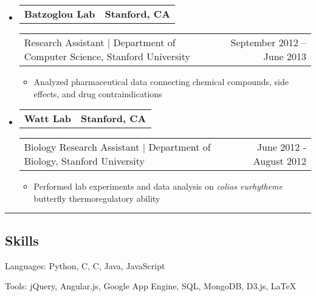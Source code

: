 \documentclass[10pt,letterpaper]{article}
\makeatletter
\newcommand{\topheaderrow}[2]
{\begin{tabular*}{\linewidth}{l@{\extracolsep{\fill}}r}
    \textbf{#1} &
    \textbf{#2}
    \vspace{0.2ex}
\end{tabular*}}
\newcommand{\botheaderrow}[2]
{\begin{tabular*}{\linewidth}{l@{\extracolsep{\fill}}r}
    #1 &
    #2 \\
\end{tabular*}}
\newcommand{\CPP}
{C\nolinebreak[4]\hspace{-.05em}\raisebox{.22ex}{\footnotesize\bf ++}}
\makeatother
\begin{document}
\begin{itemize}
    \item
    \topheaderrow
        {\textbf{Batzoglou Lab}}
        {\textbf{Stanford, CA}}
    \botheaderrow
        {Research Assistant | Department of Computer Science, Stanford University}
        {September 2012 -- June 2013}
    \begin{itemize}[label={-}, labelsep=5pt]
        \item Analyzed pharmaceutical data connecting chemical compounds, side effects, and drug contraindications
    \end{itemize}

    \item
    \topheaderrow
        {\textbf{Watt Lab}}
        {\textbf{Stanford, CA}}
    \botheaderrow
        {Biology Research Assistant | Department of Biology, Stanford University}
        {June 2012 - August 2012}
    \begin{itemize}[label={-}, labelsep=5pt]
        \item Performed lab experiments and data analysis on \emph{colias eurhytheme} butterfly thermoregulatory ability
    \end{itemize}
    
\end{itemize}


\hrule
\vspace{-0.4em}
\subsection*{Skills}

\begin{description*}
    \item[Languages:] Python, C, \CPP, Java, JavaScript
    \item[Tools:] jQuery, Angular.js, Google App Engine, SQL, MongoDB, D3.js, \LaTeX
\end{description*}
\end{document}
